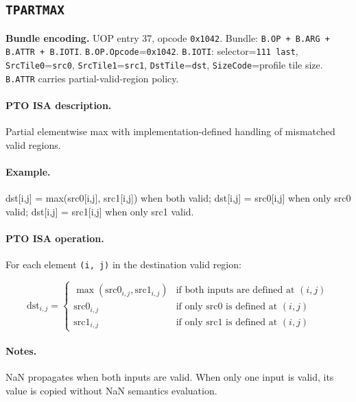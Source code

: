 \subsection{\texttt{TPARTMAX}}
\noindent\textbf{Bundle encoding.} UOP entry 37, opcode \texttt{0x1042}. Bundle: \texttt{B.OP + B.ARG + B.ATTR + B.IOTI}. \texttt{B.OP.Opcode}=\texttt{0x1042}. \texttt{B.IOTI}: selector=\texttt{111 last}, \texttt{SrcTile0}=\texttt{src0}, \texttt{SrcTile1}=\texttt{src1}, \texttt{DstTile}=\texttt{dst}, \texttt{SizeCode}=profile tile size. \texttt{B.ATTR} carries partial-valid-region policy.\par\smallskip
{\small
\paragraph{PTO ISA description.}
Partial elementwise max with implementation-defined handling of mismatched valid regions.
\paragraph{Example.}
dst[i,j] = max(src0[i,j], src1[i,j]) when both valid; dst[i,j] = src0[i,j] when only src0 valid; dst[i,j] = src1[i,j] when only src1 valid.
\par\smallskip
\paragraph{PTO ISA operation.}
For each element \texttt{(i, j)} in the destination valid region:

\[
\mathrm{dst}_{i,j} =
\begin{cases}
\max(\mathrm{src0}_{i,j}, \mathrm{src1}_{i,j}) & \text{if both inputs are defined at } (i,j) \\
\mathrm{src0}_{i,j} & \text{if only src0 is defined at } (i,j) \\
\mathrm{src1}_{i,j} & \text{if only src1 is defined at } (i,j)
\end{cases}
\]
}\par\smallskip
\paragraph{Notes.}
NaN propagates when both inputs are valid. When only one input is valid, its value is copied without NaN semantics evaluation.
